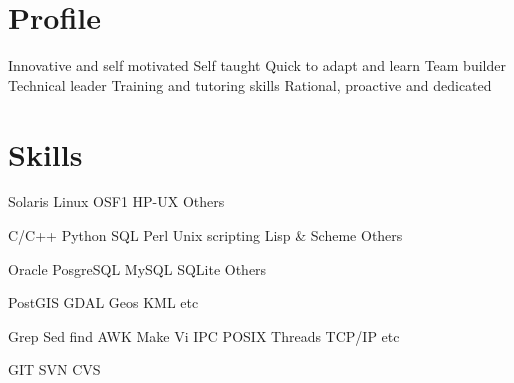 \documentclass[letterpaper]{cvitae}
\begin{document}

\begin{minipage}[t]{0.33\textwidth}

\section{Profile}


\textbullet{} Innovative and self motivated
\textbullet{} Self taught
\textbullet{} Quick to adapt and learn
\textbullet{} Team builder
\textbullet{} Technical leader
\textbullet{} Training and tutoring skills
\textbullet{} Rational, proactive and dedicated
\sectionspace
\section {Skills}

\textbullet{} Solaris \textbullet{} Linux \textbullet{} OSF1 \textbullet{} HP-UX \textbullet{} Others

\textbullet{} C/C++ \textbullet{} Python \textbullet{} SQL \textbullet{} Perl \textbullet{} Unix scripting
\textbullet{} {Lisp \& Scheme} \textbullet{} Others

\textbullet{} Oracle \textbullet{} PosgreSQL \textbullet{} MySQL \textbullet{} SQLite \textbullet{} Others

\textbullet{} PostGIS \textbullet{} GDAL \textbullet{} Geos \textbullet{} KML \textbullet{} etc

\textbullet{} Grep \textbullet{} Sed \textbullet{} find \textbullet{} AWK \textbullet{} Make
\textbullet{} Vi \textbullet{} IPC \textbullet{} POSIX Threads \textbullet{} TCP/IP \textbullet{} etc

 \textbullet{} GIT \textbullet{} SVN \textbullet{} CVS \textbullet{}


\end{minipage}
\end{document}

